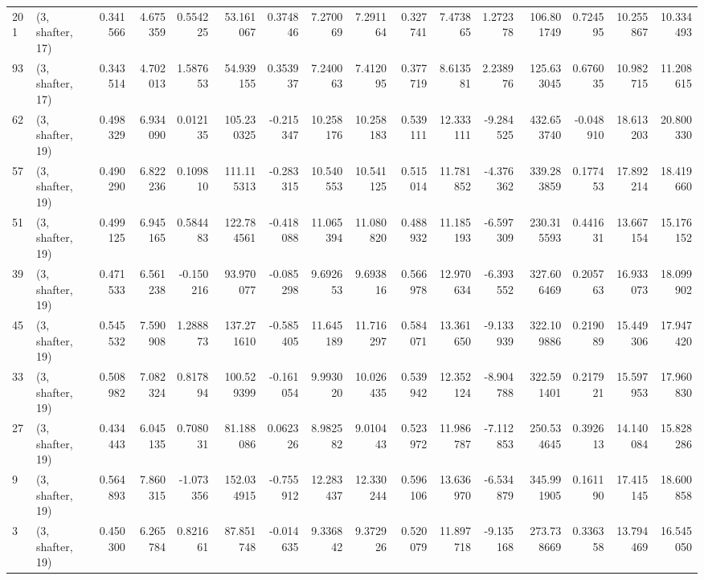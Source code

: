 \begin{tabular}{llrrrrrrrrrrrrrr}
201 &  (3, shafter, 17) &   0.341566 &   4.675359 &   0.554225 &    53.161067 &   0.374846 &   7.270069 &   7.291164 &  0.327741 &   7.473865 &   1.272378 &    106.801749 &   0.724595 &   10.255867 &   10.334493 \\
93  &  (3, shafter, 17) &   0.343514 &   4.702013 &   1.587653 &    54.939155 &   0.353937 &   7.240063 &   7.412095 &  0.377719 &   8.613581 &   2.238976 &    125.633045 &   0.676035 &   10.982715 &   11.208615 \\
62  &  (3, shafter, 19) &   0.498329 &   6.934090 &   0.012135 &   105.230325 &  -0.215347 &  10.258176 &  10.258183 &  0.539111 &  12.333111 &  -9.284525 &    432.653740 &  -0.048910 &   18.613203 &   20.800330 \\
57  &  (3, shafter, 19) &   0.490290 &   6.822236 &   0.109810 &   111.115313 &  -0.283315 &  10.540553 &  10.541125 &  0.515014 &  11.781852 &  -4.376362 &    339.283859 &   0.177453 &   17.892214 &   18.419660 \\
51  &  (3, shafter, 19) &   0.499125 &   6.945165 &   0.584483 &   122.784561 &  -0.418088 &  11.065394 &  11.080820 &  0.488932 &  11.185193 &  -6.597309 &    230.315593 &   0.441631 &   13.667154 &   15.176152 \\
39  &  (3, shafter, 19) &   0.471533 &   6.561238 &  -0.150216 &    93.970077 &  -0.085298 &   9.692653 &   9.693816 &  0.566978 &  12.970634 &  -6.393552 &    327.606469 &   0.205763 &   16.933073 &   18.099902 \\
45  &  (3, shafter, 19) &   0.545532 &   7.590908 &   1.288873 &   137.271610 &  -0.585405 &  11.645189 &  11.716297 &  0.584071 &  13.361650 &  -9.133939 &    322.109886 &   0.219089 &   15.449306 &   17.947420 \\
33  &  (3, shafter, 19) &   0.508982 &   7.082324 &   0.817894 &   100.529399 &  -0.161054 &   9.993020 &  10.026435 &  0.539942 &  12.352124 &  -8.904788 &    322.591401 &   0.217921 &   15.597953 &   17.960830 \\
27  &  (3, shafter, 19) &   0.434443 &   6.045135 &   0.708031 &    81.188086 &   0.062326 &   8.982582 &   9.010443 &  0.523972 &  11.986787 &  -7.112853 &    250.534645 &   0.392613 &   14.140084 &   15.828286 \\
9   &  (3, shafter, 19) &   0.564893 &   7.860315 &  -1.073356 &   152.034915 &  -0.755912 &  12.283437 &  12.330244 &  0.596106 &  13.636970 &  -6.534879 &    345.991905 &   0.161190 &   17.415145 &   18.600858 \\
3   &  (3, shafter, 19) &   0.450300 &   6.265784 &   0.821661 &    87.851748 &  -0.014635 &   9.336842 &   9.372926 &  0.520079 &  11.897718 &  -9.135168 &    273.738669 &   0.336358 &   13.794469 &   16.545050 \\

\end{tabular}
